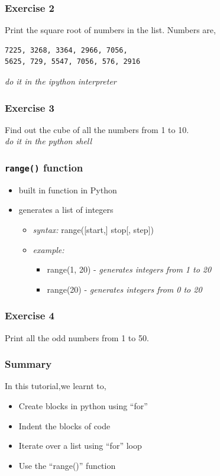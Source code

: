 \documentclass[17pt]{beamer}
\begin{document}
\begin{frame}[fragile]
\frametitle{Exercise 2}
  Print the square root of numbers in the list.
  Numbers are,
\begin{verbatim}
7225, 3268, 3364, 2966, 7056,
5625, 729, 5547, 7056, 576, 2916
\end{verbatim}
\emph{do it in the ipython interpreter}
\end{frame}
\begin{frame}[fragile]
\frametitle{Exercise 3}
  Find out the cube of all the numbers from 1 to 10. \\
  \emph{do it in the python shell}
\end{frame}
\begin{frame}
\frametitle{\verb~range()~ function}
    \begin{itemize}
    \item built in function in Python
    \item generates a list of integers
        \begin{itemize}
        \item \emph{syntax:} range([start,] stop[, step])
        \item \emph{example:}
            \begin{itemize}
            \item range(1, 20) - \emph{generates integers from 1 to 20}
            \item range(20) - \emph{generates integers from 0 to 20}
            \end{itemize}
        \end{itemize}
    \end{itemize}
\end{frame}
\begin{frame}
\frametitle{Exercise 4}
  Print all the odd numbers from 1 to 50.
\end{frame}
\begin{frame}
\frametitle{Summary}
  In this tutorial,we learnt to,
\begin{itemize}
\item Create blocks in python using ``for''
\item Indent the blocks of code
\item Iterate over a list using ``for'' loop
\item Use the ``range()'' function
\end{itemize}
\end{frame}
\end{document}
